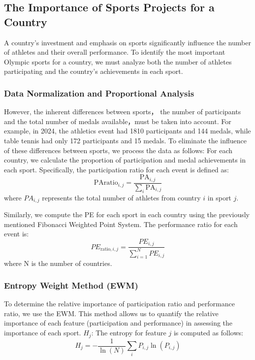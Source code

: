 \documentclass[12pt]{article}  %
\begin{document}
\subsection{The Importance of Sports Projects for a Country}
A country's investment and emphasis on sports significantly influence the number of athletes and their overall performance\cite{10}. To identify the most important Olympic sports for a country, we must analyze both the number of athletes participating and the country's achievements in each sport.

\subsubsection{Data Normalization and Proportional Analysis}
However, the inherent differences between sports， the number of participants and the total number of medals available，must be taken into account. For example, in 2024, the athletics event had 1810 participants and 144 medals, while table tennis had only 172 participants and 15 medals.
To eliminate the influence of these differences between sports, we process the data as follows:
For each country, we calculate the proportion of participation and medal achievements in each sport. Specifically, the participation ratio for each event is defined as:
\begin{equation}
    \text{PAratio}_{i,j} = \frac{\text{PA}_{i,j}}{\sum_i \text{PA}_{i,j}} \tag{18}
\end{equation}
where $PA_{i,j}$ represents the total number of athletes from country $i$ in sport $j$.

Similarly, we compute the PE for each sport in each country using the previously mentioned Fibonacci Weighted Point System. The performance ratio for each event is: 
\begin{equation}
    PE_{\text{ratio},i,j} = \frac{PE_{i,j}}{\sum_{i=1}^{N} PE_{i,j}} \tag{19}
\end{equation}
where N is the number of countries.

\subsubsection{Entropy Weight Method (EWM)}
To determine the relative importance of participation ratio and performance ratio, we use the EWM. This method allows us to quantify the relative importance of each feature (participation and performance) in assessing the importance of each sport. $H_j$: The entropy for feature $j$ is computed as follows:
\begin{equation}
    H_j = -\frac{1}{\ln(N)} \sum_i P_{i,j} \ln(P_{i,j}) \tag{20}
\end{equation}
\end{document}
